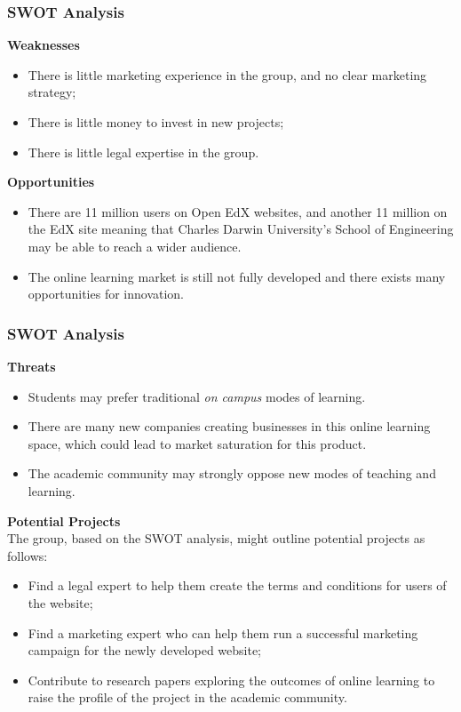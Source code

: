 \documentclass[aspectratio=169]{beamer}
\begin{document}
\begin{frame}
\frametitle{SWOT Analysis}
\textbf{Weaknesses}
\begin{itemize}
\item There is little marketing experience in the group, and no clear marketing strategy;
\item There is little money to invest in new projects;
\item There is little legal expertise in the group.
\end{itemize}
\vspace{0.5cm}
\textbf{Opportunities}
\begin{itemize}
\item There are 11 million users on Open EdX websites, and another 11 million on the EdX site meaning that Charles Darwin University's School of Engineering may be able to reach a wider audience.
\item The online learning market is still not fully developed and there exists many opportunities for innovation.
\end{itemize}
\end{frame}
\begin{frame}
\frametitle{SWOT Analysis}
\textbf{Threats}
\begin{itemize}
\item Students may prefer traditional \textit{on campus} modes of learning.
\item There are many new companies creating businesses in this online learning space, which could lead to market saturation for this product.
\item The academic community may strongly oppose new modes of teaching and learning.
\end{itemize}
\vspace{0.25cm}
\textbf{Potential Projects}\\
The group, based on the SWOT analysis, might outline potential projects as follows:
\begin{itemize}
\item Find a legal expert to help them create the terms and conditions for users of the website;
\item Find a marketing expert who can help them run a successful marketing campaign for the newly developed website;
\item Contribute to research papers exploring the outcomes of online learning to raise the profile of the project in the academic community.
\end{itemize}
\end{frame}
\end{document}
